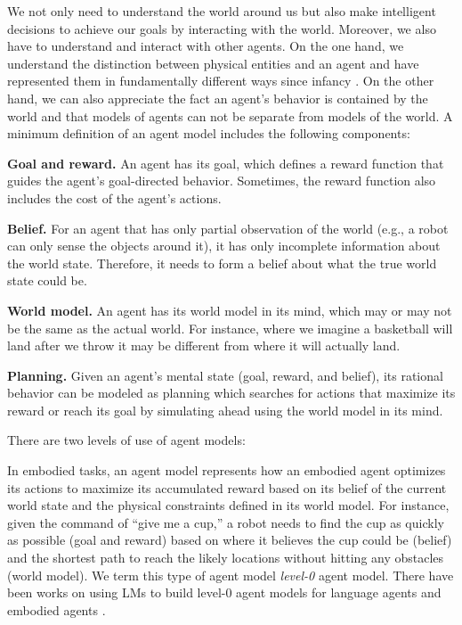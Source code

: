 \documentclass{article}
\begin{document}
We not only need to understand the world around us but also make intelligent decisions to achieve our goals by interacting with the world. Moreover, we also have to understand and interact with other agents. On the one hand, we understand the distinction between physical entities and an agent and have represented them in fundamentally different ways since infancy \cite{spelke2007core, gergely2003teleological}. On the other hand, we can also appreciate the fact an agent's behavior is contained by the world and that models of agents can not be separate from models of the world. A minimum definition of an agent model includes the following components:

{\bf Goal and reward.} An agent has its goal, which defines a reward function that guides the agent's goal-directed behavior. Sometimes, the reward function also includes the cost of the agent's actions.

{\bf Belief.} For an agent that has only partial observation of the world (e.g., a robot can only sense the objects around it), it has only incomplete information about the world state. Therefore, it needs to form a belief about what the true world state could be.

{\bf World model.} An agent has its world model in its mind, which may or may not be the same as the actual world. For instance, where we imagine a basketball will land after we throw it may be different from where it will actually land.

{\bf Planning.} Given an agent's mental state (goal, reward, and belief), its rational behavior can be modeled as planning which searches for actions that maximize its reward or reach its goal by simulating ahead using the world model in its mind.

There are two levels of use of agent models:

In embodied tasks, an agent model represents how an embodied agent optimizes its actions to maximize its accumulated reward based on its belief of the current world state and the physical constraints defined in its world model. For instance, given the command of ``give me a cup,'' a robot needs to find the cup as quickly as possible (goal and reward) based on where it believes the cup could be (belief) and the shortest path to reach the likely locations without hitting any obstacles (world model). We term this type of agent model {\it level-0} agent model. There have been works on using LMs to build level-0 agent models for language agents \citep[e.g.,][]{andreas2022language,sumers2023cognitive,deng2023mind2web} and embodied agents \citep[e.g.,][]{huang2022language, ahn2022can, li2022pre}. 
\end{document}
